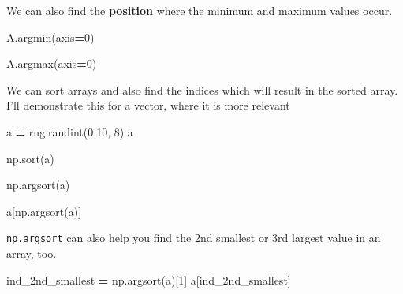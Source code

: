 \documentclass[
  letterpaper,
]{scrbook}
\newenvironment{Shaded}{\begin{snugshade}}{\end{snugshade}}
\newcommand{\DecValTok}[1]{\textcolor[rgb]{0.00,0.00,0.81}{#1}}
\newcommand{\NormalTok}[1]{#1}
\newcommand{\OperatorTok}[1]{\textcolor[rgb]{0.81,0.36,0.00}{\textbf{#1}}}
\begin{document}
We can also find the \textbf{position} where the minimum and maximum values occur.

\begin{Shaded}
\begin{Highlighting}[]
\NormalTok{A.argmin(axis}\OperatorTok{=}\DecValTok{0}\NormalTok{)}
\end{Highlighting}
\end{Shaded}

\begin{Shaded}
\begin{Highlighting}[]
\NormalTok{A.argmax(axis}\OperatorTok{=}\DecValTok{0}\NormalTok{)}
\end{Highlighting}
\end{Shaded}

We can sort arrays and also find the indices which will result in the sorted array. I'll demonstrate this for a vector, where it is more relevant

\begin{Shaded}
\begin{Highlighting}[]
\NormalTok{a }\OperatorTok{=}\NormalTok{ rng.randint(}\DecValTok{0}\NormalTok{,}\DecValTok{10}\NormalTok{, }\DecValTok{8}\NormalTok{)}
\NormalTok{a}
\end{Highlighting}
\end{Shaded}

\begin{Shaded}
\begin{Highlighting}[]
\NormalTok{np.sort(a)}
\end{Highlighting}
\end{Shaded}

\begin{Shaded}
\begin{Highlighting}[]
\NormalTok{np.argsort(a)}
\end{Highlighting}
\end{Shaded}

\begin{Shaded}
\begin{Highlighting}[]
\NormalTok{a[np.argsort(a)]}
\end{Highlighting}
\end{Shaded}

\texttt{np.argsort} can also help you find the 2nd smallest or 3rd largest value in an array, too.

\begin{Shaded}
\begin{Highlighting}[]
\NormalTok{ind\_2nd\_smallest }\OperatorTok{=}\NormalTok{ np.argsort(a)[}\DecValTok{1}\NormalTok{]}
\NormalTok{a[ind\_2nd\_smallest]}
\end{Highlighting}
\end{Shaded}
\end{document}
